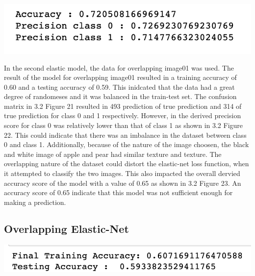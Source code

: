 \documentclass[12pt]{article}
\begin{document}
\begin{multicols*}{2}
\begin{center}
		\includegraphics[scale=0.5]{../screenshot/Non-Overlapping-Elastic-results/calc_score.png}
  \end{center}


  \hspace*{5mm} In the second elastic model, the data for overlapping image01 was used. The result of the model for overlapping
  image01 resulted in a training accuracy of 0.60 and a testing accuracy of 0.59. This inidcated that the data had a great degree of
  randomeses and it was balanced in the train-test set. The confusion matrix in 3.2 Figure 21 resulted in 493 prediction of true prediction 
  and 314 of true prediction for class 0 and 1 respectively. However, in the derived precision score for class 0 was relatively lower than that
  of class 1 as shown in 3.2 Figure 22. This could indicate that there was an imbalance in the dataset between class 0 and class 1. Additionally, because of the nature of the
  image choosen, the black and white image of apple and pear had similar texture and texture. The overlapping nature of the dataset could distort the elastic-net loss function, 
  when it attempted to classify the two images. This also impacted the overall dervied accuracy score of the model with a value of 0.65 as shown in 
  3.2 Figure 23. An accuracy score of 0.65 indicate that this model was not sufficient enough for making a prediction. 

  \subsection{Overlapping Elastic-Net} 
  \begin{center}
		\includegraphics[scale=0.5]{../screenshot/Overlapping-Elastic-results/results.png}


\end{center}
\end{multicols*}
\end{document}
